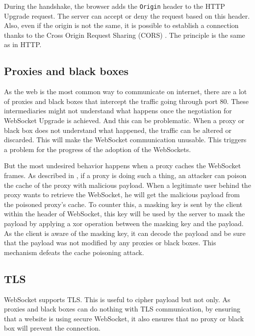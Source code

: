 \documentclass[10pt,journal,compsoc]{IEEEtran}
\newcommand{\ttt}[1]{\texttt{#1}}
\newcommand{\ws}{WebSocket}
\begin{document}
During the handshake, the browser adds the \ttt{Origin} header to the HTTP Upgrade request.
The server can accept or deny the request based on this header.
Also, even if the origin is not the same, it is possible to establish a connection thanks to the Cross Origin Request Sharing (CORS) \cite{talkingtoyourself}.
The principle is the same as in HTTP.

\subsection{Proxies and black boxes}
\label{sec:key}
As the web is the most common way to communicate on internet, there are a lot of proxies and black boxes that intercept the traffic going through port 80.
These intermediaries might not understand what happens once the negotiation for \ws{} Upgrade is achieved.
And this can be problematic.
When a proxy or black box does not understand what happened, the traffic can be altered or discarded.
This will make the \ws{} communication unusable.
This triggers a problem for the progress of the adoption of the \ws s.

But the most undesired behavior happens when a proxy caches the \ws{} frames.
As described in \cite{talkingtoyourself}, if a proxy is doing such a thing, an attacker can poison the cache of the proxy with malicious payload.
When a legitimate user behind the proxy wants to retrieve the \ws{}, he will get the malicious payload from the poisoned proxy's cache.
To counter this, a masking key is sent by the client within the header of \ws{}, this key will be used by the server to mask the payload by applying a xor operation between the masking key and the payload.
As the client is aware of the masking key, it can decode the payload and be sure that the payload was not modified by any proxies or black boxes.
This mechanism defeats the cache poisoning attack.

\subsection{TLS}
\ws{} supports TLS.
This is useful to cipher payload but not only.
As proxies and black boxes can do nothing with TLS communication, by ensuring that a website is using secure \ws{}, it also ensures that no proxy or black box will prevent the connection.
\end{document}
